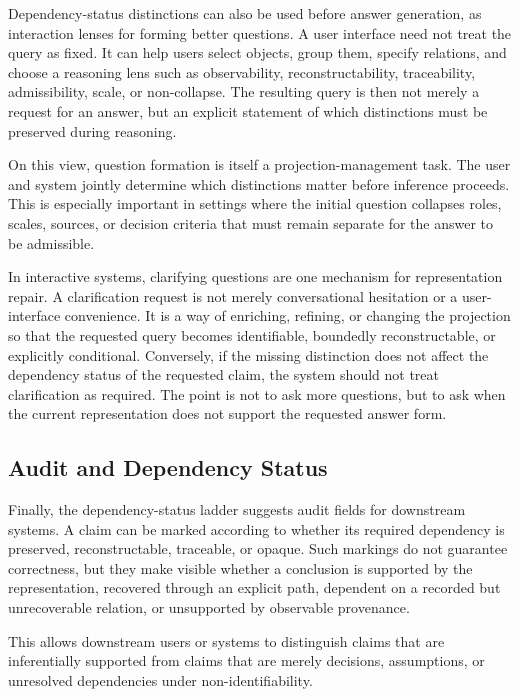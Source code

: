 \documentclass[11pt]{article}
\begin{document}
Dependency-status distinctions can also be used before answer generation, as interaction lenses for forming better questions. A user interface need not treat the query as fixed. It can help users select objects, group them, specify relations, and choose a reasoning lens such as observability, reconstructability, traceability, admissibility, scale, or non-collapse. The resulting query is then not merely a request for an answer, but an explicit statement of which distinctions must be preserved during reasoning.

On this view, question formation is itself a projection-management task. The user and system jointly determine which distinctions matter before inference proceeds. This is especially important in settings where the initial question collapses roles, scales, sources, or decision criteria that must remain separate for the answer to be admissible.

In interactive systems, clarifying questions are one mechanism for representation repair. A clarification request is not merely conversational hesitation or a user-interface convenience. It is a way of enriching, refining, or changing the projection so that the requested query becomes identifiable, boundedly reconstructable, or explicitly conditional. Conversely, if the missing distinction does not affect the dependency status of the requested claim, the system should not treat clarification as required. The point is not to ask more questions, but to ask when the current representation does not support the requested answer form.

\subsection{Audit and Dependency Status}

Finally, the dependency-status ladder suggests audit fields for downstream systems. A claim can be marked according to whether its required dependency is preserved, reconstructable, traceable, or opaque. Such markings do not guarantee correctness, but they make visible whether a conclusion is supported by the representation, recovered through an explicit path, dependent on a recorded but unrecoverable relation, or unsupported by observable provenance.

This allows downstream users or systems to distinguish claims that are inferentially supported from claims that are merely decisions, assumptions, or unresolved dependencies under non-identifiability.
\end{document}
